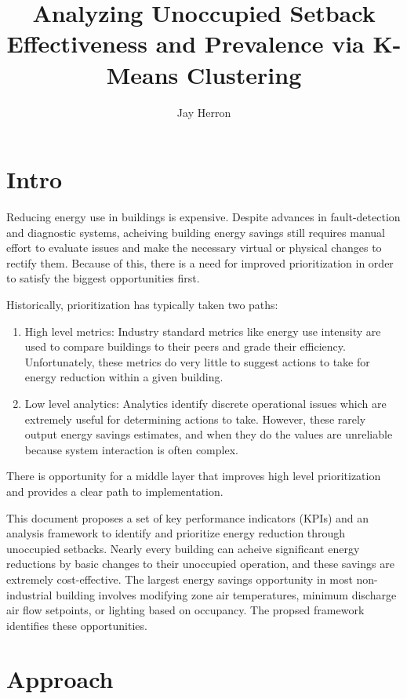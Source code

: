 \documentclass[a4paper]{article}
\begin{document}
\title{Analyzing Unoccupied Setback Effectiveness and Prevalence via K-Means Clustering}
\author{Jay Herron}
\maketitle

\section{Intro}

Reducing energy use in buildings is expensive. Despite advances in fault-detection and diagnostic systems, acheiving building energy savings still requires manual effort to evaluate issues and make the necessary virtual or physical changes to rectify them. Because of this, there is a need for improved prioritization in order to satisfy the biggest opportunities first.

Historically, prioritization has typically taken two paths:
\begin{enumerate}
\item{High level metrics: Industry standard metrics like energy use intensity are used to compare buildings to their peers and grade their efficiency. Unfortunately, these metrics do very little to suggest actions to take for energy reduction within a given building.}
\item{Low level analytics: Analytics identify discrete operational issues which are extremely useful for determining actions to take. However, these rarely output energy savings estimates, and when they do the values are unreliable because system interaction is often complex.}
\end{enumerate}

There is opportunity for a middle layer that improves high level prioritization and provides a clear path to implementation.

This document proposes a set of key performance indicators (KPIs) and an analysis framework to identify and prioritize energy reduction through unoccupied setbacks. Nearly every building can acheive significant energy reductions by basic changes to their unoccupied operation, and these savings are extremely cost-effective. The largest energy savings opportunity in most non-industrial building involves modifying zone air temperatures, minimum discharge air flow setpoints, or lighting based on occupancy. The propsed framework identifies these opportunities.

\section{Approach}
\end{document}
